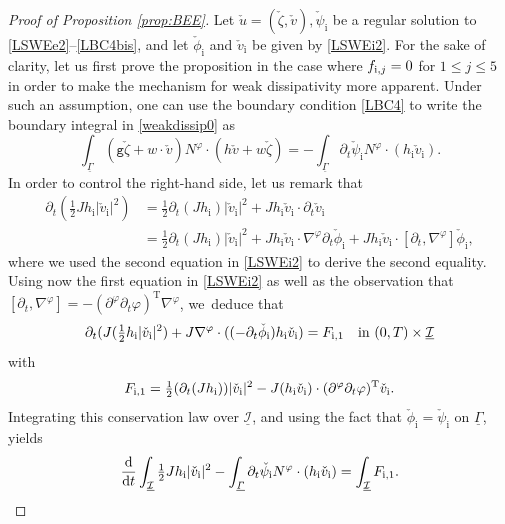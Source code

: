 \documentclass[10pt]{amsart}
\newcommand{\abs}[1]{\vert#1\vert}
\newcommand{\gr}{{\mathtt g}}
\newcommand{\dt}{\partial_t}
\newcommand{\cI}{{\mathcal I}}
\newcommand{\ul}[1]{\underline{#1}}
\newcommand{\itGamma}{\mathit{\Gamma}}
\theoremstyle{definition}
\begin{document}
\begin{proof}[Proof of Proposition \ref{prop:BEE}]
Let $\check{u}=(\check{\zeta},\check{v}), \check{\psi}_\mathrm{i}$ be a regular solution to \eqref{LSWEe2}--\eqref{LBC4bis},
and let $\check{\phi}_\mathrm{i}$ and $\check{v}_\mathrm{i}$ be given by \eqref{LSWEi2}.
For the sake of clarity, let us first prove the proposition in the case where $f_{{\rm i},j}=0$ for $1\leq j\leq 5$
in order to make the mechanism for weak dissipativity more apparent.
Under such an assumption, one can use the boundary condition \eqref{LBC4} to write the boundary integral in \eqref{weakdissip0} as
\begin{equation}\label{weakdissip1}
\int_{\ul{\itGamma}} (\gr \check{\zeta}+w\cdot\check{v})N^\varphi\cdot (h \check{v}+w\check{\zeta})
= -\int_{\ul{\itGamma}} \dt \check{\psi}_\mathrm{i} N^\varphi\cdot (h_\mathrm{i}\check{v}_\mathrm{i}).
\end{equation}
In order to control the right-hand side, let us remark that
\begin{align*}
\dt (\tfrac{1}{2}Jh_\mathrm{i}\abs{\check{v}_\mathrm{i}}^2)
&= \tfrac{1}{2}\dt(J h_\mathrm{i}) \abs{\check{v}_\mathrm{i}}^2+J h_\mathrm{i}\check{v}_\mathrm{i}\cdot \dt \check{v}_\mathrm{i} \\
&= \tfrac{1}{2}\dt(J h_\mathrm{i}) \abs{\check{v}_\mathrm{i}}^2+J h_\mathrm{i}\check{v}_\mathrm{i}\cdot \nabla^\varphi \dt \check{\phi}_\mathrm{i}
+ J h_\mathrm{i}\check{v}_\mathrm{i}\cdot [\dt,\nabla^\varphi] \check{\phi}_\mathrm{i},
\end{align*}
where we used the second equation in \eqref{LSWEi2} to derive the second equality.
Using now the first equation in \eqref{LSWEi2} as well as the observation that $[\dt,\nabla^\varphi]=-(\partial^\varphi\dt\varphi)^\mathrm{T}\nabla^\varphi$, we~deduce that
\begin{equation}\label{weakdissip2}
\dt(J(\tfrac12h_\mathrm{i}|\check{v}_\mathrm{i}|^2)
+ J\nabla^\varphi\cdot((-\dt\check{\phi}_\mathrm{i})h_\mathrm{i}\check{v}_\mathrm{i}) = F_{{\rm i},1} \quad\text{in } (0,T)\times\ul{\cI}
\end{equation}
with
\[
F_{{\rm i},1} = \tfrac12(\dt(Jh_\mathrm{i}))|\check{v}_\mathrm{i}|^2 - J(h_\mathrm{i}\check{v}_\mathrm{i})\cdot (\partial^\varphi\dt\varphi)^\mathrm{T}\check{v}_\mathrm{i}.
\]
Integrating this conservation law over $\ul{\cI}$, and using the fact that $\check{\phi}_\mathrm{i}=\check{\psi}_\mathrm{i}$ on $\ul{\itGamma}$, yields
\[
\frac{{\rm d}}{{\rm d}t} \int_{\ul{\cI}} \tfrac12 J h_\mathrm{i}\abs{\check{v}_\mathrm{i}}^2
- \int_{\ul{\itGamma}} \dt \check{\psi}_\mathrm{i} N^\varphi\cdot (h_\mathrm{i}\check{v}_\mathrm{i}) = \int_{\ul\cI}F_\mathrm{i,1}.
\]
\end{proof}
\end{document}
